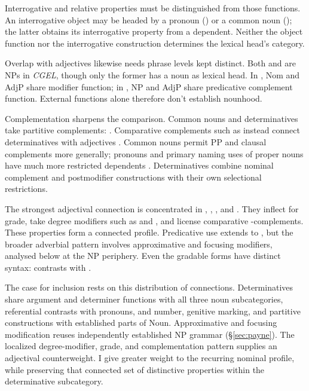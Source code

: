 \documentclass[12pt]{article}
\begin{document}
Interrogative and relative properties must be distinguished from those functions. An interrogative object may be headed by a pronoun () or a common noun (); the latter obtains its interrogative property from a dependent. Neither the object function nor the interrogative construction determines the lexical head's category.

Overlap with adjectives likewise needs phrase levels kept distinct. Both  and  are NPs in \textit{CGEL}, though only the former has a noun as lexical head. In , Nom and AdjP share modifier function; in , NP and AdjP share predicative complement function. External functions alone therefore don't establish nounhood.

Complementation sharpens the comparison. Common nouns and determinatives take partitive complements: . Comparative complements such as  instead connect determinatives with adjectives \citep[349--350, 392--394, 411--412, 432--433]{huddleston2002}. Common nouns permit PP and clausal complements more generally; pronouns and primary naming uses of proper nouns have much more restricted dependents \citep[429--430, 439--443, 517--521]{huddleston2002}. Determinatives combine nominal complement and postmodifier constructions with their own selectional restrictions.

The strongest adjectival connection is concentrated in , , , and . They inflect for grade, take degree modifiers such as  and , and license comparative -complements. These properties form a connected profile. Predicative use extends to , but the broader adverbial pattern involves approximative and focusing modifiers, analysed below at the NP periphery. Even the gradable forms have distinct syntax:  contrasts with  \citep[392--396, 431--432, 539--540]{huddleston2002}.

The case for inclusion rests on this distribution of connections. Determinatives share argument and determiner functions with all three noun subcategories, referential contrasts with pronouns, and number, genitive marking, and partitive constructions with established parts of Noun. Approximative and focusing modification reuses independently established NP grammar (§\ref{sec:payne}). The localized degree-modifier, grade, and complementation pattern supplies an adjectival counterweight. I give greater weight to the recurring nominal profile, while preserving that connected set of distinctive properties within the determinative subcategory.
\end{document}
